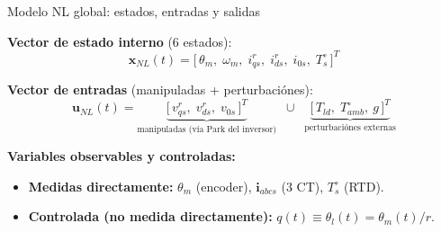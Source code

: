 \documentclass[aspectratio=169,t]{beamer}
\begin{document}
\begin{frame}{Modelo NL global: estados, entradas y salidas}
\vspace{4mm}

\textbf{Vector de estado interno} (6 estados):
\begin{equation*}
\bm{x}_{NL}(t) = \big[\,\theta_m,\;\omega_m,\;i_{qs}^{r},\;i_{ds}^{r},\;i_{0s},\;T_s^\circ\,\big]^T
\end{equation*}

\textbf{Vector de entradas} (manipuladas + perturbaciónes):
\begin{equation*}
\bm{u}_{NL}(t) = \underbrace{\big[\,v_{qs}^{r},\;v_{ds}^{r},\;v_{0s}\,\big]^T}_{\text{manipuladas (vía Park del inversor)}} \;\;\cup\;\; \underbrace{\big[\,T_{ld},\;T_{amb}^\circ,\ g\,\big]^T}_{\text{perturbaciónes externas}}
\end{equation*}

\textbf{Variables observables y controladas:}
\begin{itemize}\small
\item \textbf{Medidas directamente:} $\theta_m$ (encoder), $\bm{i}_{abcs}$ (3 CT), $T_s^\circ$ (RTD).
\item \textbf{Controlada (no medida directamente):} $q(t)\equiv\theta_l(t) = \theta_m(t)/r$.
\end{itemize}
\end{frame}
\end{document}
